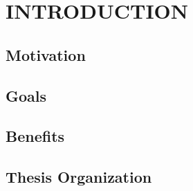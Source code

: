 
\chapter{INTRODUCTION}\label{ch:intro}


\section{Motivation}\label{sec:motive}



\section{Goals}\label{sec:goal}


\section{Benefits}\label{sec:benefits}


\section{Thesis Organization}\label{sec:organization}

